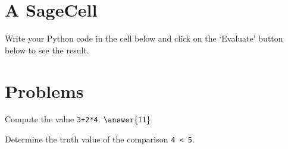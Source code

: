 \documentclass{ximera}
\begin{document}
\section{A SageCell}

Write your Python code in the cell below and click on the `Evaluate' button below to see the result.

\begin{sageCell}

\end{sageCell}

\section{Problems}

\begin{question}
	Compute the value \verb|3+2*4|. $\answer{11}$
\end{question}

\begin{question}
	Determine the truth value of the comparison \verb|4 < 5|. 
	\begin{multipleChoice}
	\end{multipleChoice}
\end{question}
\end{document}
